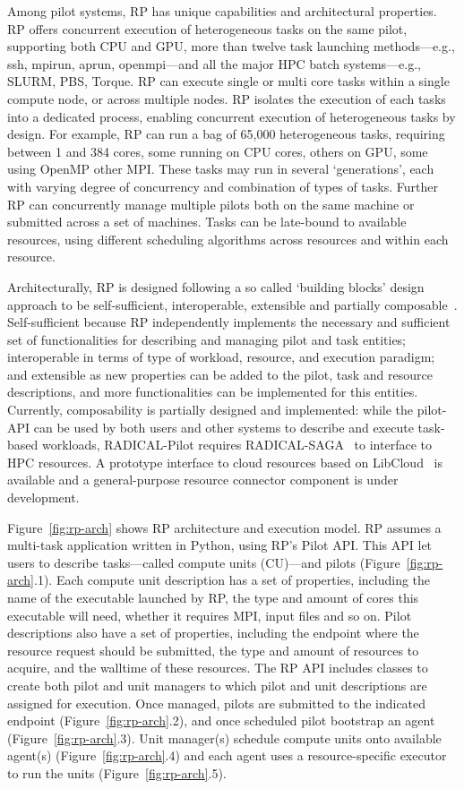 \documentclass{webofc}
\begin{document}
Among pilot systems, RP has unique capabilities and architectural properties.
RP offers concurrent execution of heterogeneous tasks on the same pilot,
supporting both CPU and GPU, more than twelve task launching methods---e.g.,
ssh, mpirun, aprun, openmpi---and all the major HPC batch systems---e.g.,
SLURM, PBS, Torque. RP can execute single or multi core tasks within a single
compute node, or across multiple nodes. RP isolates the execution of each
tasks into a dedicated process, enabling concurrent execution of
heterogeneous tasks by design. For example, RP can run a bag of 65,000
heterogeneous tasks, requiring between 1 and 384 cores, some running on CPU
cores, others on GPU, some using OpenMP other MPI. These tasks may run in
several ‘generations’, each with varying degree of concurrency and
combination of types of tasks. Further RP can concurrently manage multiple
pilots both on the same machine or submitted across a set of machines. Tasks
can be late-bound to available resources, using different scheduling
algorithms across resources and within each resource.
	
Architecturally, RP is designed following a so called ‘building blocks’
design approach to be self-sufficient, interoperable, extensible and
partially composable~\cite{turilli2018building}. Self-sufficient because RP
independently implements the necessary and sufficient set of functionalities
for describing and managing pilot and task entities; interoperable in terms
of type of workload, resource, and execution paradigm; and extensible as new
properties can be added to the pilot, task and resource descriptions, and
more functionalities can be implemented for this entities. Currently,
composability is partially designed and implemented: while the pilot-API can
be used by both users and other systems to describe and execute task-based
workloads, RADICAL-Pilot requires RADICAL-SAGA~\cite{MERZKY20153} to interface to HPC resources.
A prototype interface to cloud resources based on LibCloud~\cite{LibCloud} is available and a
general-purpose resource connector component is under development.
	
Figure~\ref{fig:rp-arch} shows RP architecture and execution model. RP
assumes a multi-task application written in Python, using RP's Pilot API.
This API let users to describe tasks---called compute units (CU)---and pilots
(Figure~\ref{fig:rp-arch}.1). Each compute unit description has a set of
properties, including the name of the executable launched by RP, the type and
amount of cores this executable will need, whether it requires MPI, input
files and so on. Pilot descriptions also have a set of properties, including
the endpoint where the resource request should be submitted, the type and
amount of resources to acquire, and the walltime of these resources. The RP
API includes classes to create both pilot and unit managers to which pilot
and unit descriptions are assigned for execution. Once managed, pilots are
submitted to the indicated endpoint (Figure~\ref{fig:rp-arch}.2), and once
scheduled pilot bootstrap an agent (Figure~\ref{fig:rp-arch}.3). Unit
manager(s) schedule compute units onto available agent(s)
(Figure~\ref{fig:rp-arch}.4) and each agent uses a resource-specific executor
to run the units (Figure~\ref{fig:rp-arch}.5).
\end{document}
